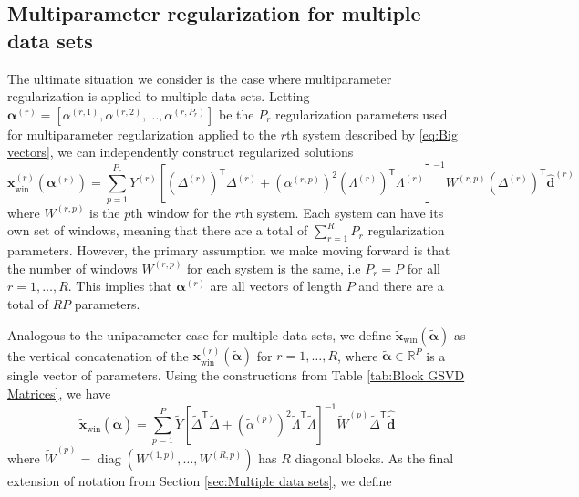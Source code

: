 \documentclass[12pt]{article}
\newcommand{\dVec}{\mathbf{d}}	%
\newcommand{\xVec}{\mathbf{x}}	%
\newcommand{\trans}[1]{{#1}^\mathsf{T}}	%
\newcommand{\inv}[1]{{#1}^{-1}}	%
\DeclareMathOperator{\diag}{diag}	%
\newcommand{\dft}[1]{\widehat{#1}}	%
\newcommand{\regparam}{\alpha}  %
\newcommand{\regparamVec}{\bm{\regparam}}   %
\newcommand{\regparamVecBig}{\widetilde{\regparamVec}}   %
\newcommand{\xWin}{\xVec_{\text{win}}}	%
\newcommand{\xBig}{\widetilde{\xVec}}	%
\newcommand{\xWinBig}{\xBig_{\text{win}}}	%
\newcommand{\dBig}{\widetilde{\dVec}}	%
\begin{document}
\subsection{Multiparameter regularization for multiple data sets} \label{sec:Adapted regularization}

The ultimate situation we consider is the case where multiparameter regularization is applied to multiple data sets. Letting $\regparamVec^{(r)} = [\regparam^{(r,1)},\regparam^{(r,2)},\ldots,\regparam^{(r,P_r)}]$ be the $P_r$ regularization parameters used for multiparameter regularization applied to the $r$th system described by \eqref{eq:Big vectors}, we can independently construct regularized solutions
\[\xWin^{(r)}\left(\regparamVec^{(r)}\right) = \sum_{p=1}^{P_r} Y^{(r)}\inv{\left[\trans{\left(\Delta^{(r)}\right)}\Delta^{(r)} + \left(\regparam^{(r,p)}\right)^2 \trans{\left(\Lambda^{(r)}\right)}\Lambda^{(r)}\right]}W^{(r,p)}\trans{\left(\Delta^{(r)}\right)}\dft{\dVec}^{(r)}\]
where $W^{(r,p)}$ is the $p$th window for the $r$th system. Each system can have its own set of windows, meaning that there are a total of $\sum_{r=1}^{R} P_r$ regularization parameters. However, the primary assumption we make moving forward is that the number of windows $W^{(r,p)}$ for each system is the same, i.e $P_r = P$ for all $r = 1,\ldots,R$. This implies that $\regparamVec^{(r)}$ are all vectors of length $P$ and there are a total of $RP$ parameters. \par
Analogous to the uniparameter case for multiple data sets, we define $\xWinBig(\regparamVecBig)$ as the vertical concatenation of the $\xWin^{(r)}\left(\regparamVecBig\right)$ for $r = 1,\ldots,R$, where $\regparamVecBig \in \mathbb{R}^P$ is a single vector of parameters. Using the constructions from Table \ref{tab:Block GSVD Matrices}, we have
\begin{equation}
\label{eq:Big Windowed Solution}
    \xWinBig(\regparamVecBig) = \sum_{p=1}^{P} \widetilde{Y}\inv{\left[\trans{\widetilde{\Delta}}\widetilde{\Delta} + \left(\widetilde{\regparam}^{(p)}\right)^2 \trans{\widetilde{\Lambda}}\widetilde{\Lambda}\right]}\widetilde{W}^{(p)}\trans{\widetilde{\Delta}}\dft{\dBig}
\end{equation}
where $\widetilde{W}^{(p)} = \diag(W^{(1,p)},\ldots,W^{(R,p)})$ has $R$ diagonal blocks. As the final extension of notation from Section \ref{sec:Multiple data sets}, we define
\end{document}
